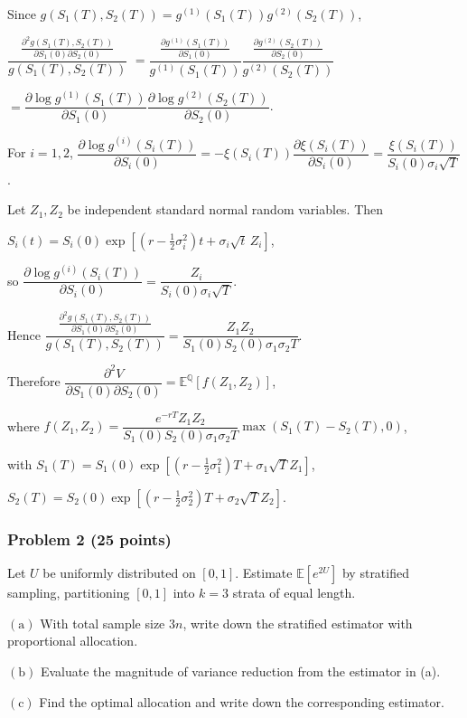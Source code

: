 Since $g(S_1(T),S_2(T))=g^{(1)}(S_1(T))g^{(2)}(S_2(T))$,

$\dfrac{\frac{\partial^2g(S_1(T),S_2(T))}{\partial S_1(0)\partial S_2(0)}}{g(S_1(T),S_2(T))}$
$=\dfrac{\frac{\partial g^{(1)}(S_1(T))}{\partial S_1(0)}}{g^{(1)}(S_1(T))}
\dfrac{\frac{\partial g^{(2)}(S_2(T))}{\partial S_2(0)}}{g^{(2)}(S_2(T))}$

$=\dfrac{\partial\log g^{(1)}(S_1(T))}{\partial S_1(0)}
\dfrac{\partial\log g^{(2)}(S_2(T))}{\partial S_2(0)}$.

For $i=1,2$,
$\dfrac{\partial\log g^{(i)}(S_i(T))}{\partial S_i(0)}
=-\xi(S_i(T))\dfrac{\partial\xi(S_i(T))}{\partial S_i(0)}
=\dfrac{\xi(S_i(T))}{S_i(0)\sigma_i\sqrt T}$.

Let $Z_1,Z_2$ be independent standard normal random variables. Then

$S_i(t)=S_i(0)\exp\left[\left(r-\frac12\sigma_i^2\right)t+\sigma_i\sqrt t\,Z_i\right]$,

so
$\dfrac{\partial\log g^{(i)}(S_i(T))}{\partial S_i(0)}
=\dfrac{Z_i}{S_i(0)\sigma_i\sqrt T}$.

Hence
$\dfrac{\frac{\partial^2g(S_1(T),S_2(T))}{\partial S_1(0)\partial S_2(0)}}{g(S_1(T),S_2(T))}
=\dfrac{Z_1Z_2}{S_1(0)S_2(0)\sigma_1\sigma_2T}$.

Therefore
$\dfrac{\partial^2V}{\partial S_1(0)\partial S_2(0)}
=\mathbb E^{\mathbb Q}[f(Z_1,Z_2)]$,

where
$f(Z_1,Z_2)=\dfrac{e^{-rT}Z_1Z_2}{S_1(0)S_2(0)\sigma_1\sigma_2T}
\max(S_1(T)-S_2(T),0)$,

with
$S_1(T)=S_1(0)\exp\left[\left(r-\frac12\sigma_1^2\right)T+\sigma_1\sqrt T Z_1\right]$,

$S_2(T)=S_2(0)\exp\left[\left(r-\frac12\sigma_2^2\right)T+\sigma_2\sqrt T Z_2\right]$.

\subsubsection*{Problem 2 (25 points)}

 Let $U$ be uniformly distributed on $[0,1]$. Estimate $\mathbb E[e^{2U}]$ by stratified sampling, partitioning $[0,1]$ into $k=3$ strata of equal length.

$\mathrm{(a)}$ With total sample size $3n$, write down the stratified estimator with proportional allocation.

$\mathrm{(b)}$ Evaluate the magnitude of variance reduction from the estimator in (a).

$\mathrm{(c)}$ Find the optimal allocation and write down the corresponding estimator.

